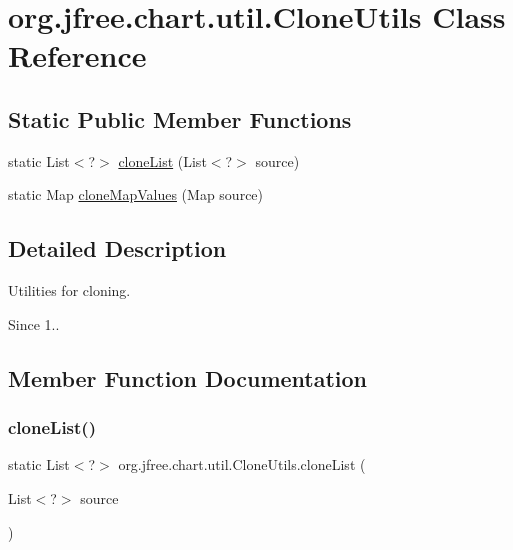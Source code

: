 \hypertarget{classorg_1_1jfree_1_1chart_1_1util_1_1_clone_utils}{}\section{org.\+jfree.\+chart.\+util.\+Clone\+Utils Class Reference}
\label{classorg_1_1jfree_1_1chart_1_1util_1_1_clone_utils}
\subsection*{Static Public Member Functions}
\begin{DoxyCompactItemize}
\item 
static List$<$?$>$ \mbox{\hyperlink{classorg_1_1jfree_1_1chart_1_1util_1_1_clone_utils_ac0d6a02cd6c91426dfc576bad0e72e2e}{clone\+List}} (List$<$?$>$ source)
\item 
static Map \mbox{\hyperlink{classorg_1_1jfree_1_1chart_1_1util_1_1_clone_utils_a7a96fe6f0ac75477bf11f518825a7f2b}{clone\+Map\+Values}} (Map source)
\end{DoxyCompactItemize}


\subsection{Detailed Description}
Utilities for cloning.

\begin{DoxySince}{Since}
1.. 
\end{DoxySince}


\subsection{Member Function Documentation}
\mbox{\label{classorg_1_1jfree_1_1chart_1_1util_1_1_clone_utils_ac0d6a02cd6c91426dfc576bad0e72e2e}} 
\subsubsection{\texorpdfstring{clone\+List()}{cloneList()}}
{\footnotesize\ttfamily static List$<$?$>$ org.\+jfree.\+chart.\+util.\+Clone\+Utils.\+clone\+List (\begin{DoxyParamCaption}\item[{List$<$?$>$}]{source }\end{DoxyParamCaption})\hspace{0.3cm}{\ttfamily [static]}}

